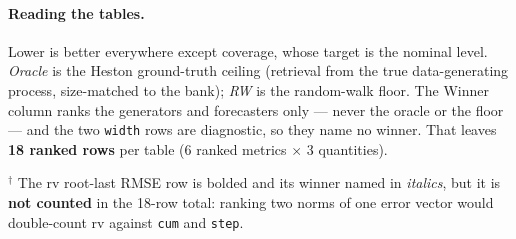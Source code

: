 \documentclass[11pt,a4paper]{article}
\begin{document}
\paragraph{Reading the tables.} Lower is better everywhere except coverage,
whose target is the nominal level. \emph{Oracle} is the Heston ground-truth
ceiling (retrieval from the true data-generating process, size-matched to the
bank); \emph{RW} is the random-walk floor. The Winner column ranks the
generators and forecasters only --- never the oracle or the floor --- and the
two \texttt{width} rows are diagnostic, so they name no winner. That leaves
\textbf{18 ranked rows} per table ($6$ ranked metrics $\times$ $3$ quantities).

$^{\dagger}$ The rv root-last RMSE row is bolded and its winner named in
\emph{italics}, but it is \textbf{not counted} in the 18-row total: ranking two
norms of one error vector would double-count rv against \texttt{cum} and
\texttt{step}.
\clearpage
\end{document}
